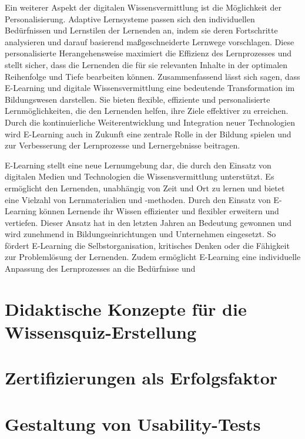 Ein weiterer Aspekt der digitalen Wissensvermittlung ist die Möglichkeit der Personalisierung. Adaptive Lernsysteme passen sich den individuellen Bedürfnissen und Lernstilen der Lernenden an, indem sie deren Fortschritte analysieren und darauf basierend maßgeschneiderte Lernwege vorschlagen. Diese personalisierte Herangehensweise maximiert die Effizienz des Lernprozesses und stellt sicher, dass die Lernenden die für sie relevanten Inhalte in der optimalen Reihenfolge und Tiefe bearbeiten können.
Zusammenfassend lässt sich sagen, dass E-Learning und digitale Wissensvermittlung eine bedeutende Transformation im Bildungswesen darstellen. Sie bieten flexible, effiziente und personalisierte Lernmöglichkeiten, die den Lernenden helfen, ihre Ziele effektiver zu erreichen. Durch die kontinuierliche Weiterentwicklung und Integration neuer Technologien wird E-Learning auch in Zukunft eine zentrale Rolle in der Bildung spielen und zur Verbesserung der Lernprozesse und Lernergebnisse beitragen.

E-Learning stellt eine neue Lernumgebung dar, die durch den Einsatz von digitalen Medien und 
Technologien die Wissensvermittlung unterstützt. Es ermöglicht den Lernenden, unabhängig von Zeit und 
Ort zu lernen und bietet eine Vielzahl von Lernmaterialien und -methoden. %
Durch den Einsatz von E-Learning können Lernende ihr Wissen effizienter und flexibler erweitern und vertiefen. %
Dieser Ansatz hat in den letzten Jahren an Bedeutung gewonnen und wird zunehmend in 
Bildungseinrichtungen und Unternehmen eingesetzt. So fördert E-Learning die Selbstorganisation, kritisches
Denken oder die Fähigkeit zur Problemlösung der Lernenden. 
Zudem ermöglicht E-Learning eine individuelle Anpassung des Lernprozesses an die Bedürfnisse und 
\section{Didaktische Konzepte für die Wissensquiz-Erstellung}
\section{Zertifizierungen als Erfolgsfaktor}
\section{Gestaltung von Usability-Tests}